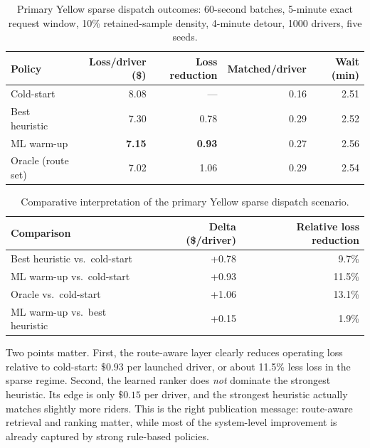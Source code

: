 \documentclass[journal]{IEEEtran}
\begin{document}
\begin{table}[!t]
\caption{Primary Yellow sparse dispatch outcomes: 60-second batches, 5-minute exact request window, 10\% retained-sample density, 4-minute detour, 1000 drivers, five seeds.}
\label{tab:dispatch_primary}
\centering
\scriptsize
\setlength{\tabcolsep}{2.6pt}
\begin{tabular}{lrrrr}
\toprule
Policy & Loss/driver (\$) & Loss reduction & Matched/driver & Wait (min) \\
\midrule
Cold-start & 8.08 & --- & 0.16 & 2.51 \\
Best heuristic & 7.30 & 0.78 & 0.29 & 2.52 \\
ML warm-up & \textbf{7.15} & \textbf{0.93} & 0.27 & 2.56 \\
Oracle (route set) & 7.02 & 1.06 & 0.29 & 2.54 \\
\bottomrule
\end{tabular}
\end{table}

\begin{table}[!t]
\caption{Comparative interpretation of the primary Yellow sparse dispatch scenario.}
\label{tab:dispatch_delta}
\centering
\footnotesize
\begin{tabularx}{\columnwidth}{Yrr}
\toprule
Comparison & Delta (\$/driver) & Relative loss reduction \\
\midrule
Best heuristic vs.\ cold-start & +0.78 & 9.7\% \\
ML warm-up vs.\ cold-start & +0.93 & 11.5\% \\
Oracle vs.\ cold-start & +1.06 & 13.1\% \\
ML warm-up vs.\ best heuristic & +0.15 & 1.9\% \\
\bottomrule
\end{tabularx}
\end{table}

Two points matter. First, the route-aware layer clearly reduces operating loss relative to cold-start: \(\$0.93\) per launched driver, or about 11.5\% less loss in the sparse regime. Second, the learned ranker does \emph{not} dominate the strongest heuristic. Its edge is only \(\$0.15\) per driver, and the strongest heuristic actually matches slightly more riders. This is the right publication message: route-aware retrieval and ranking matter, while most of the system-level improvement is already captured by strong rule-based policies.
\end{document}
